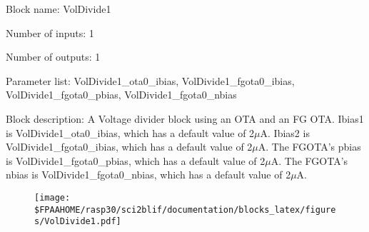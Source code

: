 \pagebreak

Block name: VolDivide1

Number of inputs: 1

Number of outputs: 1

Parameter list: VolDivide1\_ota0\_ibias, VolDivide1\_fgota0\_ibias, VolDivide1\_fgota0\_pbias, VolDivide1\_fgota0\_nbias

Block description: 
A Voltage divider block using an OTA and an FG OTA. Ibias1 is VolDivide1\_ota0\_ibias, which has a default value of 2$\mu$A. Ibias2 is VolDivide1\_fgota0\_ibias, which has a default value of 2$\mu$A. The FGOTA's pbias is VolDivide1\_fgota0\_pbias, which has a default value of 2$\mu$A. The FGOTA's nbias is VolDivide1\_fgota0\_nbias, which has a default value of 2$\mu$A. 

\begin{figure}[H]  %
\texttt{[image: \$FPAAHOME/rasp30/sci2blif/documentation/blocks\_latex/figures/VolDivide1.pdf]}
\end{figure}

